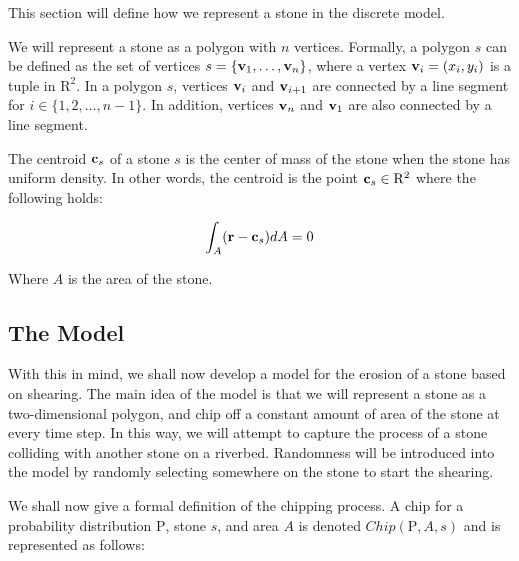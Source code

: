 This section will define how we represent a stone in the discrete model.

We will represent a stone as a polygon with $n$ vertices. Formally, a polygon $s$ can be defined as the set of vertices $s = \{ \mathbf{v}_1, \ldots, \mathbf{v}_n \}$, where a vertex $\mathbf{v}_i = (x_i, y_i)$ is a tuple in $\mathrm{R}^2$. In a polygon $s$, vertices $\mathbf{v}_i$ and $\mathbf{v}_{i+1}$ are connected by a line segment for $i \in \{1,2, \ldots, n-1\}$. In addition, vertices $\mathbf{v}_{n}$ and $\mathbf{v}_1$ are also connected by a line segment.

The centroid $\mathbf{c}_s$ of a stone $s$ is the center of mass of the stone when the stone has uniform density. In other words, the centroid is the point $\mathbf{c}_s \in \mathrm{R}^2$ where the following holds:

\begin{eqnarray}
 \int_A (\mathbf{r} - \mathbf{c}_s) dA = 0
\end{eqnarray}

Where $A$ is the area of the stone.

\subsection{The Model}

With this in mind, we shall now develop a model for the erosion of a stone based on shearing. The main idea of the model is that we will represent a stone as a two-dimensional polygon, and chip off a constant amount of area of the stone at every time step. In this way, we will attempt to capture the process of a stone colliding with another stone on a riverbed. Randomness will be introduced into the model by randomly selecting somewhere on the stone to start the shearing.

We shall now give a formal definition of the chipping process. A chip for a probability distribution $\mathrm{P}$, stone $s$, and area $A$ is denoted $Chip(\mathrm{P}, A, s)$ and is represented as follows:


